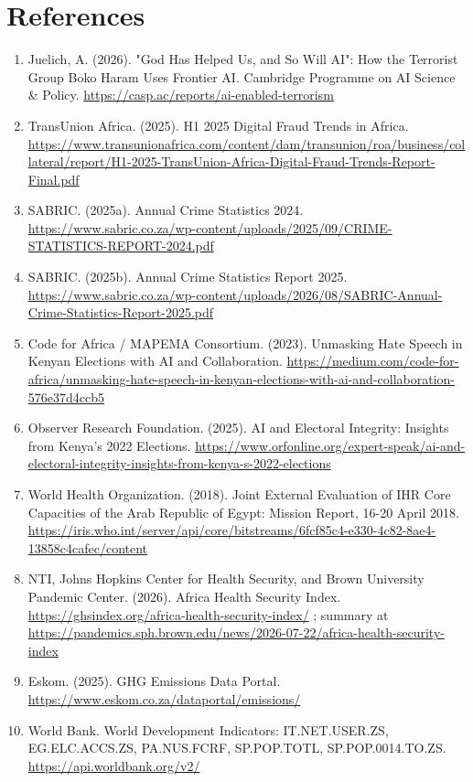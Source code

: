 \section*{References}
{\small\begin{enumerate}\setlength{\itemsep}{1pt}
\item Juelich, A. (2026). "God Has Helped Us, and So Will AI": How the Terrorist Group Boko Haram Uses Frontier AI. Cambridge Programme on AI Science \& Policy. \url{https://casp.ac/reports/ai-enabled-terrorism}
\item TransUnion Africa. (2025). H1 2025 Digital Fraud Trends in Africa. \url{https://www.transunionafrica.com/content/dam/transunion/roa/business/collateral/report/H1-2025-TransUnion-Africa-Digital-Fraud-Trends-Report-Final.pdf}
\item SABRIC. (2025a). Annual Crime Statistics 2024. \url{https://www.sabric.co.za/wp-content/uploads/2025/09/CRIME-STATISTICS-REPORT-2024.pdf}
\item SABRIC. (2025b). Annual Crime Statistics Report 2025. \url{https://www.sabric.co.za/wp-content/uploads/2026/08/SABRIC-Annual-Crime-Statistics-Report-2025.pdf}
\item Code for Africa / MAPEMA Consortium. (2023). Unmasking Hate Speech in Kenyan Elections with AI and Collaboration. \url{https://medium.com/code-for-africa/unmasking-hate-speech-in-kenyan-elections-with-ai-and-collaboration-576e37d4ccb5}
\item Observer Research Foundation. (2025). AI and Electoral Integrity: Insights from Kenya's 2022 Elections. \url{https://www.orfonline.org/expert-speak/ai-and-electoral-integrity-insights-from-kenya-s-2022-elections}
\item World Health Organization. (2018). Joint External Evaluation of IHR Core Capacities of the Arab Republic of Egypt: Mission Report, 16-20 April 2018. \url{https://iris.who.int/server/api/core/bitstreams/6fcf85c4-e330-4c82-8ae4-13858c4cafec/content}
\item NTI, Johns Hopkins Center for Health Security, and Brown University Pandemic Center. (2026). Africa Health Security Index. \url{https://ghsindex.org/africa-health-security-index/} ; summary at \url{https://pandemics.sph.brown.edu/news/2026-07-22/africa-health-security-index}
\item Eskom. (2025). GHG Emissions Data Portal. \url{https://www.eskom.co.za/dataportal/emissions/}
\item World Bank. World Development Indicators: IT.NET.USER.ZS, EG.ELC.ACCS.ZS, PA.NUS.FCRF, SP.POP.TOTL, SP.POP.0014.TO.ZS. \url{https://api.worldbank.org/v2/}

\end{enumerate}}
